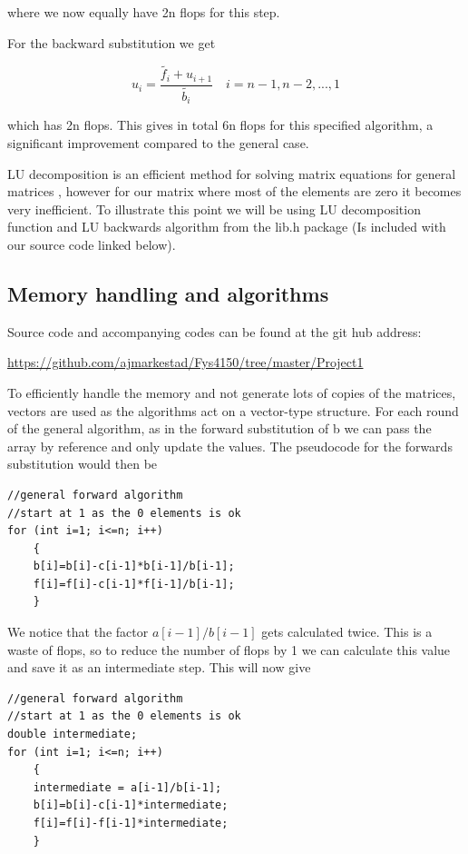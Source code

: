 \documentclass[a4paper,11pt]{article}
\begin{document}
{where we now equally have 2n flops for this step. 
		
For the backward substitution we get 
		
\begin{equation}
u_i = \frac{\tilde{f_i} + u_{i+1}}{\tilde{b_i}}\quad i = n-1, n-2, ..., 1
\label{eq:forward_specific_u}
\end{equation}
		
which has 2n flops. 
This gives in total 6n flops for this specified algorithm, a significant improvement compared to the general case. 


LU decomposition is an efficient method for solving matrix equations for general matrices \cite{M.Hjort-Jensen_CompFys}, however for our matrix where most of the elements are zero it becomes very inefficient. To illustrate this point we will be using LU decomposition function and LU backwards algorithm from the lib.h package (Is included with our source code linked below).

	
\subsection{Memory handling and algorithms}

Source code and accompanying codes can be found at the git hub address:

\url{https://github.com/ajmarkestad/Fys4150/tree/master/Project1}


To efficiently handle the memory and not generate lots of copies of the matrices, vectors are used as the algorithms act on a vector-type structure. For each round of the general algorithm, as in the forward substitution of b we can pass the array by reference and only update the values. The pseudocode for the forwards substitution would then be
\begin{lstlisting}
//general forward algorithm
//start at 1 as the 0 elements is ok
for (int i=1; i<=n; i++)
	{
	b[i]=b[i]-c[i-1]*b[i-1]/b[i-1];
	f[i]=f[i]-c[i-1]*f[i-1]/b[i-1];
	}
\end{lstlisting}
		
We notice that the factor $a[i-1]/b[i-1]$ gets calculated twice. This is a waste of flops, so to reduce the number of flops by 1 we can calculate this value and save it as an intermediate step. This will now give
		
\begin{lstlisting}
//general forward algorithm
//start at 1 as the 0 elements is ok
double intermediate; 
for (int i=1; i<=n; i++)
	{
	intermediate = a[i-1]/b[i-1];
	b[i]=b[i]-c[i-1]*intermediate;
	f[i]=f[i]-f[i-1]*intermediate;
	}
\end{lstlisting}
		
}
\end{document}

